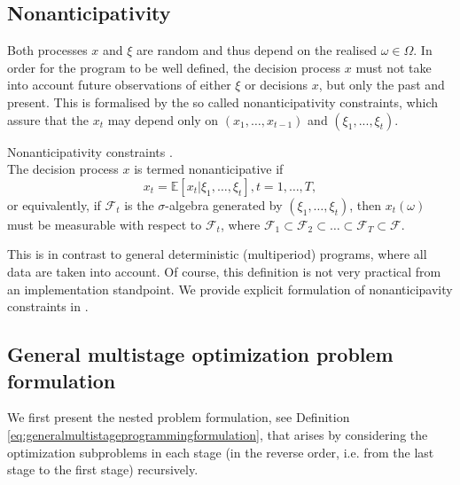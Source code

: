\subsection{Nonanticipativity}
Both processes $x$ and $\xi$ are random and thus depend on the realised $\omega \in \Omega$. In order for the program to be well defined, the decision process $x$ must not take into account future observations of either
$\xi$ or decisions $x$, but only the past and present. This is formalised by the so called nonanticipativity constraints, which assure that the $x_t$ may depend only on $(x_1,\dots,x_{t-1})$ and $(\xi_1,...,\xi_{t})$.

\begin{defn}{Nonanticipativity constraints} \cite[Section 3.3.]{stochasticprogrammingbible}. \\
\label{def:nonanticipativity constraints}
The decision process $x$ is termed nonanticipative if
\begin{equation*}
x_t=\mathbb{E}\left[x_t|\xi_1,\dots,\xi_t \right], t=1,\dots,T,
\end{equation*}
or equivalently, if $\mathcal{F}_t$ is the $\sigma$-algebra generated by $(\xi_1,\dots,\xi_t)$, then $x_t(\omega)$ must be measurable with respect to $\mathcal{F}_t$, where $\mathcal{F}_1 \subset \mathcal{F}_2 \subset \dots \subset \mathcal{F}_T \subset \mathcal{F}$.
\end{defn}
This is in contrast to general deterministic (multiperiod) programs, where all data are taken into account. Of course, this definition is not very practical from an implementation standpoint. We provide explicit formulation of nonanticipavity constraints in .

\subsection{General multistage optimization problem formulation}
We first present the nested problem formulation, see Definition \ref{eq:generalmultistageprogrammingformulation}, that arises by considering the optimization subproblems in each stage (in the reverse order, i.e. from the last stage to the first stage) recursively.

